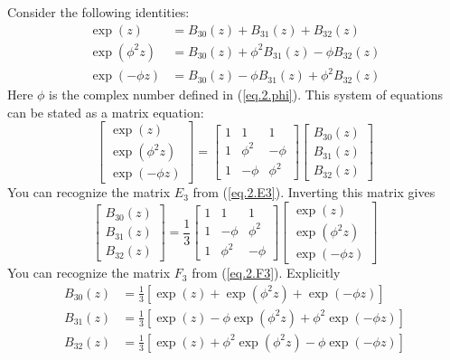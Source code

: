 Consider the following identities:
\begin{align}
    \exp\left( z \right) &= B_{30}(z) + B_{31}(z) + B_{32}(z) \\
    \exp\left( \phi^{2} z \right) &= B_{30}(z) + \phi^{2} B_{31}(z) - \phi B_{32}(z) \\
    \exp\left( -\phi z \right) &= B_{30}(z) - \phi B_{31}(z) + \phi^{2} B_{32}(z)
\end{align}
Here $\phi$ is the complex number defined in (\ref{eq.2.phi}). This system of equations can be stated as a matrix equation:
\begin{equation}
    \begin{bmatrix}
        \exp\left( z \right) \\ \exp\left( \phi^{2} z \right) \\ \exp\left( -\phi z \right)
    \end{bmatrix} = \begin{bmatrix}
        1 & 1 & 1 \\ 1 & \phi^{2} & {-\phi} \\ 1 & {-\phi} & \phi^{2}
    \end{bmatrix}
    \begin{bmatrix}
        B_{30}(z) \\ B_{31}(z) \\ B_{32}(z)
    \end{bmatrix}
\end{equation}
You can recognize the matrix $E_{3}$ from (\ref{eq.2.E3}). Inverting this matrix gives
\begin{equation}
    \begin{bmatrix}
        B_{30}(z) \\ B_{31}(z) \\ B_{32}(z)
    \end{bmatrix} = \frac{1}{3} \begin{bmatrix}
        1 & 1 & 1 \\ 1 & {-\phi} & \phi^{2} \\ 1 & \phi^{2} & {-\phi}
    \end{bmatrix}
    \begin{bmatrix}
        \exp\left( z \right) \\ \exp\left( \phi^{2} z \right) \\ \exp\left( -\phi z \right)
    \end{bmatrix}
\end{equation}
You can recognize the matrix $F_{3}$ from (\ref{eq.2.F3}). Explicitly
\begin{align}
    B_{30}(z) &= \frac{1}{3} \left[ \exp(z) + \exp\left(\phi^{2} z\right) + \exp\left(-\phi z\right) \right] \\
    B_{31}(z) &= \frac{1}{3} \left[ \exp(z) - \phi \exp\left(\phi^{2} z\right) + \phi^{2}\exp\left(-\phi z\right) \right] \\
    B_{32}(z) &= \frac{1}{3} \left[ \exp(z) + \phi^{2} \exp\left(\phi^{2} z\right) - \phi \exp\left(-\phi z\right) \right]
\end{align}
